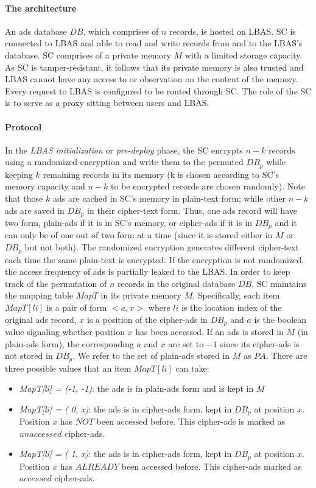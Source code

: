 \paragraph{The architecture}
An ads database $DB$, which comprises of $n$ records, is hosted on LBAS. SC is connected to LBAS and able to read and write records from and to the LBAS's database. SC comprises of a private memory $M$ with a limited storage capacity. As SC is tamper-resistant, it follows that its private memory is also trusted and LBAS cannot have any access to or observation on the content of the memory. Every request to LBAS is configured to be routed through SC. The role of the SC is to serve as a proxy sitting between users and LBAS. 


\paragraph{Protocol}
In the \textit{LBAS initialization} or \textit{pre-deploy} phase, the SC encrypts $n-k$ records using a randomized encryption and write them to the permuted $DB_p$ while keeping $k$ remaining records in its memory (k is chosen according to SC's memory capacity and $n-k$ to be encrypted records are chosen randomly). Note that those $k$ ads are cached in SC's memory in plain-text form; while other $n-k$ ads are saved in $DB_p$ in their cipher-text form. Thus, one ads record will have two form, plain-ads if it is in SC's memory, or cipher-ads if it is in $DB_p$ and it can only be of one out of two form at a time (since it is stored either in $M$ or $DB_p$ but not both).
The randomized encryption generates different cipher-text each time the same plain-text is encrypted. If the encryption is not randomized, the access frequency of ads is partially leaked to the LBAS. In order to keep track of the permutation of $n$ records in the original database $DB$,
SC maintains the mapping table $MapT$ in its private memory $M$. Specifically, each item $MapT[li]$  is a pair of form $<a, x>$ where $li$ is the location index of the original ads record, $x$ is a position of the cipher-ads in $DB_p$ and $a$ is the boolean value signaling whether position $x$ has been accessed. If an ads is stored in $M$ (in plain-ads form), the corresponding $a$ and $x$ are set to $-1$ since its cipher-ads is not stored in $DB_p$. We refer to the set of plain-ads stored in $M$ as $PA$. There are three possible values that an item $MapT[li]$ can take:

\begin{itemize}
\item \textit{MapT[li] = (-1, -1)}: the ads is in plain-ads form and is kept in $M$
\item \textit{MapT[li] = ( 0, x)}: the ads is in cipher-ads form, kept in $DB_p$ at position $x$. Position $x$ has $NOT$ been accessed before. This cipher-ads is marked as $unaccessed$ cipher-ads.
\item \textit{MapT[li] = ( 1, x)}: the ads is in cipher-ads form, kept in $DB_p$ at position $x$. Position $x$ has $ALREADY$ been accessed before. This cipher-ads marked as $accessed$ cipher-ads.
\end{itemize}


